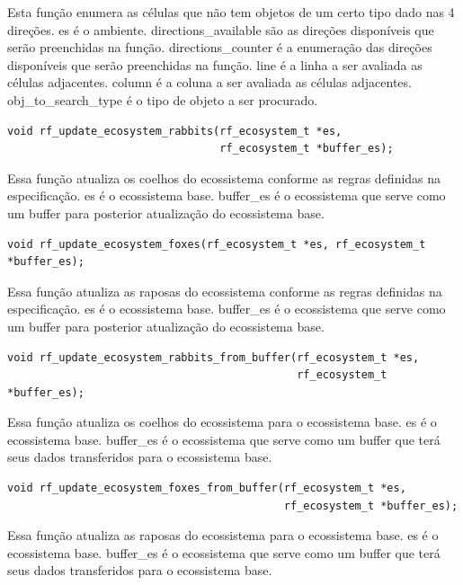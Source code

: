\documentclass[12pt]{article}
\begin{document}
Esta função enumera as células que não tem objetos de um certo tipo dado nas 4 direções.
es é o ambiente.
directions\_available são as direções disponíveis que serão preenchidas na função.
directions\_counter é a enumeração das direções disponíveis que serão preenchidas na função.
line é a linha a ser avaliada as células adjacentes.
column é a coluna a ser avaliada as células adjacentes.
obj\_to\_search\_type é o tipo de objeto a ser procurado.



\begin{verbatim}
void rf_update_ecosystem_rabbits(rf_ecosystem_t *es,
                                 rf_ecosystem_t *buffer_es);
      \end{verbatim}

Essa função atualiza os coelhos do ecossistema conforme as regras definidas na especificação.
es é o ecossistema base.
buffer\_es é o ecossistema que serve como um buffer para posterior atualização do ecossistema base.



\begin{verbatim}
void rf_update_ecosystem_foxes(rf_ecosystem_t *es, rf_ecosystem_t *buffer_es);
      \end{verbatim}


Essa função atualiza as raposas do ecossistema conforme as regras definidas na especificação.
es é o ecossistema base.
buffer\_es é o ecossistema que serve como um buffer para posterior atualização do ecossistema base.

\begin{verbatim}
void rf_update_ecosystem_rabbits_from_buffer(rf_ecosystem_t *es,
                                             rf_ecosystem_t *buffer_es);
      \end{verbatim}

Essa função atualiza os coelhos do ecossistema para o ecossistema base.
es é o ecossistema base.
buffer\_es é o ecossistema que serve como um buffer que terá seus dados transferidos para o ecossistema base.



\begin{verbatim}
void rf_update_ecosystem_foxes_from_buffer(rf_ecosystem_t *es,
                                           rf_ecosystem_t *buffer_es);
      \end{verbatim}

Essa função atualiza as raposas do ecossistema para o ecossistema base.
es é o ecossistema base.
buffer\_es é o ecossistema que serve como um buffer que terá seus dados transferidos para o ecossistema base.
\end{document}
